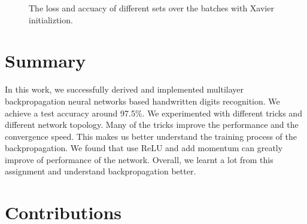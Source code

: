 \documentclass{article} %
\begin{document}
\begin{figure} [!htbp]
	
	\caption{The loss and accuacy of different sets over the batches with Xavier initializtion. }  
	
\end{figure}

\section{Summary}
In this work, we successfully derived and implemented multilayer backpropagation neural networks based handwritten digits recognition. We achieve a test accuracy around 97.5\%. We experimented with different tricks and different network topology. Many of the tricks improve the performance and the convergence speed. This makes us better understand the training process of the backpropagation. We found that use ReLU and add momentum can greatly improve of performance of the network. Overall, we learnt a lot from this assignment and understand backpropagation better. 

\section{Contributions}
\end{document}
